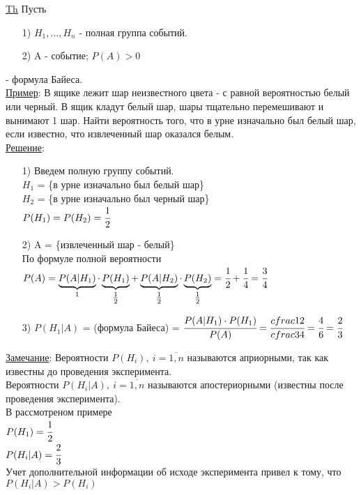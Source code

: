 
\underline{Th} Пусть \\
\begin{enumerate}
\item[1)] $H_1, \ldots, H_n$ - полная группа событий.

\item[2)] A - событие; $P(A) > 0$ \\
\end{enumerate}
 - формула Байеса. \\


\underline{Пример}: В ящике лежит шар неизвестного цвета - с равной вероятностью белый или черный. В ящик кладут белый шар, шары тщательно перемешивают и вынимают 1 шар. Найти вероятность того, что в урне изначально был белый шар, если известно, что извлеченный шар оказался белым. \\
\underline{Решение}: \\
\begin{enumerate}
\item[1)] Введем полную группу событий. \\
$H_1$ = \{в урне изначально был белый шар\} \\
$H_2$ = \{в урне изначально был черный шар\} \\
$P(H_1) = P(H_2) = \cfrac{1}{2}$ \\

\item[2)] A = \{извлеченный шар - белый\} \\
По формуле полной вероятности \\
$P(A) = \underbrace{P(A|H_1)}_{1} \cdot \underbrace{P(H_1)}_{\tfrac{1}{2}} + \underbrace{P(A|H_2)}_{\tfrac{1}{2}} \cdot \underbrace{P(H_2)}_{\tfrac{1}{2}} = \cfrac{1}{2} + \cfrac{1}{4} = \cfrac{3}{4}$ \\

\item[3)] $P(H_1|A)$ = (формула Байеса) = $\cfrac{P(A|H_1) \cdot P(H_1)}{P(A)} = \cfrac{cfrac{1}{2}}{cfrac{3}{4}} = \cfrac{4}{6} = \cfrac{2}{3}$ \\
\end{enumerate}
\underline{Замечание}: Вероятности $P(H_i), \ i = \overline{1,n}$ называются априорными, так как известны до проведения эксперимента. \\
Вероятности $P(H_i|A), \ i = \overline{1,n}$ называются апостериорными (известны после проведения эксперимента). \\
В рассмотреном примере \\
$P(H_1) = \cfrac{1}{2}$ \\
$P(H_i|A) = \cfrac{2}{3}$ \\
Учет дополнительной информации об исходе эксперимента привел к тому, что \\
$P(H_i|A) > P(H_i)$ \\ %


